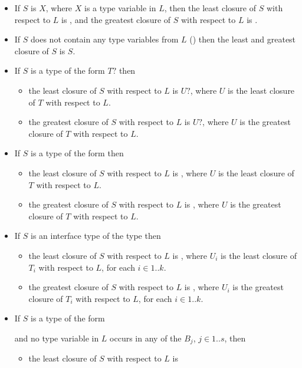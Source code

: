 \documentclass[makeidx]{article}
\begin{document}
{\begin{itemize}
\item
  If $S$ is $X$, where $X$ is a type variable in $L$, then
  the least closure of $S$ with respect to $L$ is ,
  and the greatest closure of $S$ with respect to $L$ is .
\item
  If $S$ does not contain any type variables from $L$
  ()
  then the least and greatest closure of $S$ is $S$.
\item
  If $S$ is a type of the form $T?$ then
  \begin{itemize}
  \item
    the least closure of $S$ with respect to $L$ is $U?$,
    where $U$ is the least closure of $T$ with respect to $L$.
  \item
    the greatest closure of $S$ with respect to $L$ is $U?$,
    where $U$ is the greatest closure of $T$ with respect to $L$.
  \end{itemize}
\item
  If $S$ is a type of the form  then
  \begin{itemize}
  \item
    the least closure of $S$ with respect to $L$ is ,
    where $U$ is the least closure of $T$ with respect to $L$.
  \item
    the greatest closure of $S$ with respect to $L$ is ,
    where $U$ is the greatest closure of $T$ with respect to $L$.
  \end{itemize}
\item
  If $S$ is an interface type of the type  then
  \begin{itemize}
  \item
    the least closure of $S$ with respect to $L$ is ,
    where $U_i$ is the least closure of $T_i$ with respect to $L$,
    for each $i \in 1 .. k$.
  \item
    the greatest closure of $S$ with respect to $L$
    is ,
    where $U_i$ is the greatest closure of $T_i$ with respect to $L$,
    for each $i \in 1 .. k$.
  \end{itemize}
\item
  If $S$ is a type of the form

  \noindent

  \noindent
  and no type variable in $L$ occurs in any of the $B_j$, $j \in 1 .. s$,
  then
  \begin{itemize}
  \item
    the least closure of $S$ with respect to $L$ is


\end{itemize}
\end{itemize}}
\end{document}
